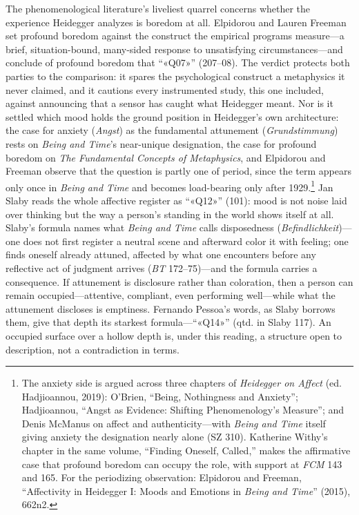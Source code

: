 The phenomenological literature's liveliest quarrel concerns whether the experience Heidegger
analyzes is boredom at all. Elpidorou and Lauren Freeman set profound boredom against the
construct the empirical programs measure---a brief, situation-bound, many-sided response to
unsatisfying circumstances---and conclude of profound boredom that ``«Q07»'' (207--08). The
verdict protects both parties to the comparison: it spares the psychological construct a
metaphysics it never claimed, and it cautions every instrumented study, this one included,
against announcing that a sensor has caught what Heidegger meant. Nor is it settled which
mood holds the ground position in Heidegger's own architecture: the case for anxiety
(\textit{Angst}) as the fundamental attunement (\textit{Grundstimmung}) rests on
\textit{Being and Time}'s near-unique designation, the case for profound boredom on
\textit{The Fundamental Concepts of Metaphysics}, and Elpidorou and Freeman observe that the
question is partly one of period, since the term appears only once in \textit{Being and Time}
and becomes load-bearing only after 1929.\footnote{The anxiety side is argued across three
chapters of \textit{Heidegger on Affect} (ed. Hadjioannou, 2019): O'Brien, ``Being,
Nothingness and Anxiety''; Hadjioannou, ``Angst as Evidence: Shifting Phenomenology's
Measure''; and Denis McManus on affect and authenticity---with \textit{Being and Time}
itself giving anxiety the designation nearly alone (SZ 310). Katherine Withy's chapter in the
same volume, ``Finding Oneself, Called,'' makes the affirmative case that profound boredom
can occupy the role, with support at \textit{FCM} 143 and 165. For the periodizing
observation: Elpidorou and Freeman, ``Affectivity in Heidegger I: Moods and Emotions in
\textit{Being and Time}'' (2015), 662n2.} Jan Slaby reads the whole affective register as
``«Q12»'' (101): mood is not noise laid over thinking but the way a person's standing in the
world shows itself at all. Slaby's formula names what \textit{Being and Time} calls
disposedness (\textit{Befindlichkeit})---one does not first register a neutral scene and
afterward color it with feeling; one finds oneself already attuned, affected by what one
encounters before any reflective act of judgment arrives (\textit{BT} 172--75)---and the
formula carries a consequence. If attunement is disclosure rather than coloration, then a
person can remain occupied---attentive, compliant, even performing well---while what the
attunement discloses is emptiness. Fernando Pessoa's words, as Slaby borrows them, give that
depth its starkest formula---``«Q14»'' (qtd. in Slaby 117). An occupied surface over a hollow
depth is, under this reading, a structure open to description, not a contradiction in terms.

